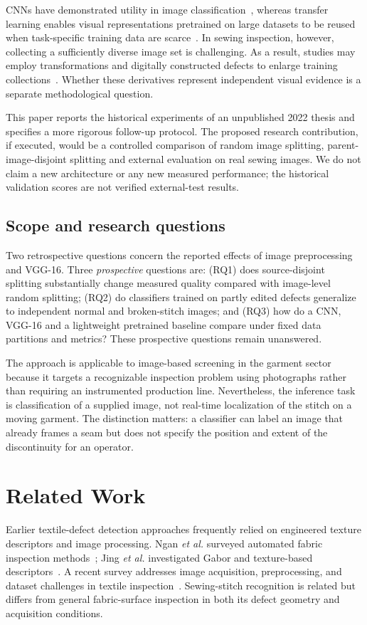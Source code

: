 \documentclass[conference,a4paper]{IEEEtran}
\begin{document}
CNNs have demonstrated utility in image classification~\cite{alexnet}, whereas transfer learning enables visual representations pretrained on large datasets to be reused when task-specific training data are scarce~\cite{yosinski,vgg}. In sewing inspection, however, collecting a sufficiently diverse image set is challenging. As a result, studies may employ transformations and digitally constructed defects to enlarge training collections~\cite{augment}. Whether these derivatives represent independent visual evidence is a separate methodological question.

This paper reports the historical experiments of an unpublished 2022 thesis and specifies a more rigorous follow-up protocol. The proposed research contribution, if executed, would be a controlled comparison of random image splitting, parent-image-disjoint splitting and external evaluation on real sewing images. We do not claim a new architecture or any new measured performance; the historical validation scores are not verified external-test results.

\subsection{Scope and research questions}
Two retrospective questions concern the reported effects of image preprocessing and VGG-16. Three \emph{prospective} questions are: (RQ1) does source-disjoint splitting substantially change measured quality compared with image-level random splitting; (RQ2) do classifiers trained on partly edited defects generalize to independent normal and broken-stitch images; and (RQ3) how do a CNN, VGG-16 and a lightweight pretrained baseline compare under fixed data partitions and metrics? These prospective questions remain unanswered.

The approach is applicable to image-based screening in the garment sector because it targets a recognizable inspection problem using photographs rather than requiring an instrumented production line. Nevertheless, the inference task is classification of a supplied image, not real-time localization of the stitch on a moving garment. The distinction matters: a classifier can label an image that already frames a seam but does not specify the position and extent of the discontinuity for an operator.

\section{Related Work}
Earlier textile-defect detection approaches frequently relied on engineered texture descriptors and image processing. Ngan \emph{et al.} surveyed automated fabric inspection methods~\cite{ngan}; Jing \emph{et al.} investigated Gabor and texture-based descriptors~\cite{jing}. A recent survey addresses image acquisition, preprocessing, and dataset challenges in textile inspection~\cite{heReview}. Sewing-stitch recognition is related but differs from general fabric-surface inspection in both its defect geometry and acquisition conditions.
\end{document}
